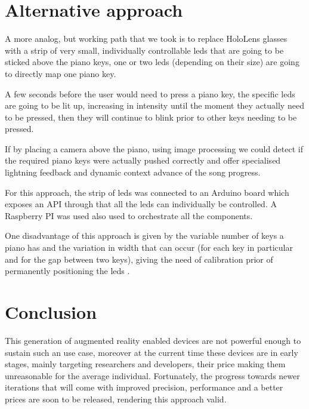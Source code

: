 \documentclass[12 pct]{report}
\begin{document}
\section{Alternative approach}
A more analog, but working path that we took is to replace HoloLens glasses with a strip of very small, individually controllable leds that are going to be sticked above the piano keys, one or two leds (depending on their size) are going to directly map one piano key. 

A few seconds before the user would need to press a piano key, the specific leds are going to be lit up, increasing in intensity until the moment they actually need to be pressed, then they will continue to blink prior to other keys needing to be pressed.

If by placing a camera above the piano, using image processing we could detect if the required piano keys were actually pushed correctly and offer specialised lightning feedback and dynamic context advance of the song progress.

For this approach, the strip of leds was connected to an Arduino board which exposes an API through that all the leds can individually be controlled. A Raspberry PI was used also used to orchestrate all the components.

One disadvantage of this approach is given by the variable number of keys a piano has and the variation in width that can occur (for each key in particular and for the gap between two keys), giving the need of calibration prior of permanently positioning the leds .

\section{Conclusion}
This generation of augmented reality enabled devices are not powerful enough to sustain such an use case, moreover at the current time these devices are in early stages, mainly targeting researchers and developers, their price making them unreasonable for the average individual. Fortunately, the progress towards newer iterations that will come with improved precision, performance and a better prices are soon to be released, rendering this approach valid.
\end{document}

